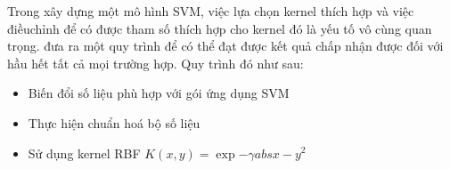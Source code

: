 Trong xây dựng một mô hình SVM, việc lựa chọn kernel thích hợp và việc điềuchỉnh để có được tham số thích hợp cho kernel đó là yếu tố vô cùng quan trọng. 
\cite{hsu2003practical} đưa ra một quy trình để có thể đạt được kết quả chấp nhận được đối với hầu hết tất cả mọi trường hợp. Quy trình đó như sau:

\begin{itemize}
  \item Biến đổi số liệu phù hợp với gói ứng dụng SVM
  \item Thực hiện chuẩn hoá bộ số liệu
  \item Sử dụng kernel RBF $K(x, y) = \exp{- \gamma abs{x - y}^2}$
\end{itemize}




